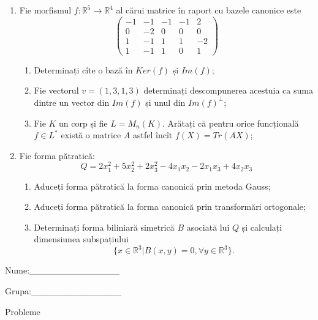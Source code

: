 \documentclass{article}
\begin{document}
\begin{enumerate}
 \item Fie morfismul $f:\mathbb{R}^5 \to \mathbb{R}^4$ al cărui matrice în raport cu bazele canonice este
$$\begin{pmatrix}
-1&-1&-1&-1&2\\
0&-2&0&0&0\\
1&-1&1&1&-2\\
1&-1&1&0&1
\end{pmatrix}$$

\begin{enumerate}
\item Determinați cîte o bază în $Ker(f)$ și $Im(f)$;
\item Fie vectorul $v=(1,3,1,3)$ determinați descompunerea acestuia ca suma dintre un vector din $Im(f)$ și unul din $Im(f)^\perp$;
\item Fie $K$ un corp și fie $L=M_n(K)$. Arătați că pentru orice funcțională $f \in L^*$ există o matrice $A$ astfel încît $f(X)=Tr(AX)$;
\end{enumerate}
\item Fie forma pătratică:
$$Q= 2x_1^2+5x_2^2+2x_3^2-4x_1x_2-2x_1x_3+4x_2x_3$$

\begin{enumerate}
\item Aduceți forma pătratică la forma canonică prin metoda Gauss;
\item Aduceți forma pătratică la forma canonică prin transformări ortogonale;
\item Determinați forma biliniară simetrică $B$ asociată lui $Q$ și calculați dimensiunea subspațiului
$$\{x \in \mathbb{R}^3 | B(x,y)=0,\forall y \in \mathbb{R}^3\}.$$

\end{enumerate}
\end{enumerate}
\newpage
\begin{flushright}
Nume:\_\_\_\_\_\_\_\_\_\_\_\_\_\_
 
 
Grupa:\_\_\_\_\_\_\_\_\_\_\_\_\_\_
\end{flushright}
\begin{center}
\vspace{2cm}
{\Large Probleme}
\vspace{2cm}
\end{center}
\end{document}

